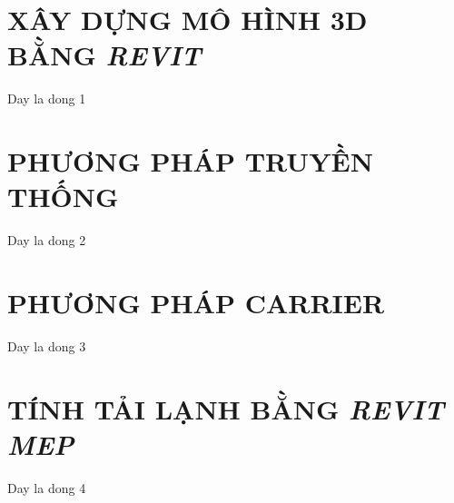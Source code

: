 \newpage
{}

\section{XÂY DỰNG MÔ HÌNH 3D BẰNG \emph{REVIT}}
Day la dong 1

\section{PHƯƠNG PHÁP TRUYỀN THỐNG}
Day la dong 2

\section{PHƯƠNG PHÁP CARRIER}
Day la dong 3

\section{TÍNH TẢI LẠNH BẰNG \emph{REVIT MEP}}
Day la dong 4


